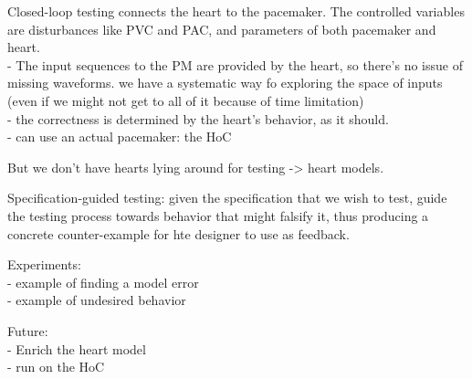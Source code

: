Closed-loop testing connects the heart to the pacemaker. The controlled variables are disturbances like PVC and PAC, and parameters of both pacemaker and heart.
\\
- The input sequences to the PM are provided by the heart, so there's no issue of missing waveforms. we have a systematic way fo exploring the space of inputs (even if we might not get to all of it because of time limitation)
\\
- the correctness is determined by the heart's behavior, as it should.
\\
- can use an actual pacemaker: the HoC 

But we don't have hearts lying around for testing -> heart models.

Specification-guided testing: given the specification that we wish to test, guide the testing process towards behavior that might falsify it, thus producing a concrete counter-example for hte designer to use as feedback.

Experiments:\\
- example of finding a model error \\
- example of undesired behavior

Future:\\
- Enrich the heart model \\
- run on the HoC
